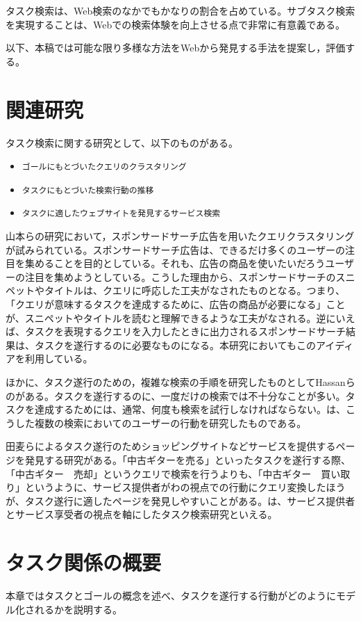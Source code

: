 \documentclass[submit,techreq]{ipsj}
\def\|{\verb|}
\begin{document}
タスク検索は、Web検索のなかでもかなりの割合を占めている。サブタスク検索を実現することは、Webでの検索体験を向上させる点で非常に有意義である。

以下、本稿では可能な限り多様な方法をWebから発見する手法を提案し，評価する。


%2
\section{関連研究}

タスク検索に関する研究として、以下のものがある。

\begin{itemize}
\item \|ゴールにもとづいたクエリのクラスタリング|
\item \|タスクにもとづいた検索行動の推移|
\item \|タスクに適したウェブサイトを発見するサービス検索|
\end{itemize}

山本らの研究\cite{yamatake}において，スポンサードサーチ広告を用いたクエリクラスタリングが試みられている。スポンサードサーチ広告は、できるだけ多くのユーザーの注目を集めることを目的としている。それも、広告の商品を使いたいだろうユーザーの注目を集めようとしている。こうした理由から、スポンサードサーチのスニペットやタイトルは、クエリに呼応した工夫がなされたものとなる。つまり、「クエリが意味するタスクを達成するために、広告の商品が必要になる」ことが、スニペットやタイトルを読むと理解できるような工夫がなされる。逆にいえば、タスクを表現するクエリを入力したときに出力されるスポンサードサーチ結果は、タスクを遂行するのに必要なものになる。本研究においてもこのアイディアを利用している。

ほかに、タスク遂行のための，複雑な検索の手順を研究したものとしてHassanらの\cite{hassan}がある。タスクを遂行するのに、一度だけの検索では不十分なことが多い。タスクを達成するためには、通常、何度も検索を試行しなければならない。\cite{hassan}は、こうした複数の検索においてのユーザーの行動を研究したものである。


田麦らによるタスク遂行のためショッピングサイトなどサービスを提供するページを発見する研究\cite{tamugi}がある。「中古ギターを売る」といったタスクを遂行する際、「中古ギター　売却」というクエリで検索を行うよりも、「中古ギター　買い取り」というように、サービス提供者がわの視点での行動にクエリ変換したほうが、タスク遂行に適したページを発見しやすいことがある。\cite{tamugi}は、サービス提供者とサービス享受者の視点を軸にしたタスク検索研究といえる。


\section{タスク関係の概要}
本章ではタスクとゴールの概念を述べ、タスクを遂行する行動がどのようにモデル化されるかを説明する。
\end{document}
